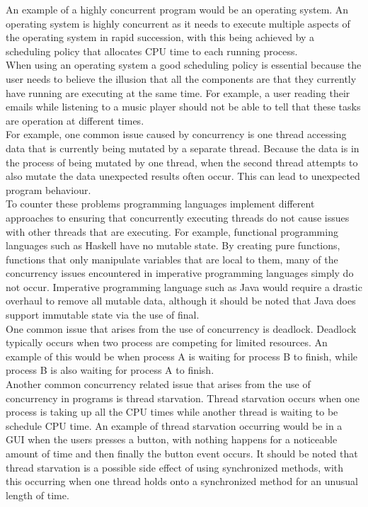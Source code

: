 \documentclass[11pt]{article}  %
\theoremstyle{definition}
\theoremstyle{remark}
\begin{document}
An example of a highly concurrent program would be an operating system. An operating system is highly concurrent as it needs to execute multiple aspects of the operating system in rapid succession, with this being achieved by a scheduling policy that allocates CPU time to each running process.\\

When using an operating system a good scheduling policy is essential because the user needs to believe the illusion that all the components are that they currently have running are executing at the same time. For example, a user reading their emails while listening to a music player should not be able to tell that these tasks are operation at different times.\\

For example, one common issue caused by concurrency is one thread accessing data that is currently being mutated by a separate thread. Because the data is in the process of being mutated by one thread, when the second thread attempts to also mutate the data unexpected results often occur. This can lead to unexpected program behaviour.\\

To counter these problems programming languages implement different approaches to ensuring that concurrently executing threads do not cause issues with other threads that are executing. For example, functional programming languages such as Haskell have no mutable state. By creating pure functions, functions that only manipulate variables that are local to them, many of the concurrency issues encountered in imperative programming languages simply do not occur. Imperative programming language such as Java would require a drastic overhaul to remove all mutable data, although it should be noted that Java does support immutable state via the use of final.\\

One common issue that arises from the use of concurrency is deadlock. Deadlock typically occurs when two process are competing for limited resources. An example of this would be when process A is waiting for process B to finish, while process B is also waiting for process A to finish.\\

Another common concurrency related issue that arises from the use of concurrency in programs is thread starvation. Thread starvation occurs when one process is taking up all the CPU times while another thread is waiting to be schedule CPU time. An example of thread starvation occurring would be in a GUI when the users presses a button, with nothing happens for a noticeable amount of time and then finally the button event occurs. It should be noted that thread starvation is a possible side effect of using synchronized methods, with this occurring when one thread holds onto a synchronized method for an unusual length of time. \\
\end{document}
